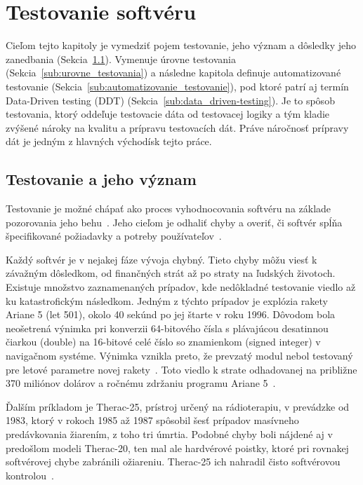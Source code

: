 
\chapter{Testovanie softvéru}
\label{ch:kap2}

Cieľom tejto kapitoly je vymedziť pojem testovanie, jeho význam a dôsledky jeho zanedbania (Sekcia~\ref{sub:testovanie_a_vyznam}). Vymenuje úrovne testovania (Sekcia~\ref{sub:urovne_testovania}) a následne kapitola definuje automatizované testovanie (Sekcia~\ref{sub:automatizovanie_testovanie}), pod ktoré patrí aj termín Data-Driven testing (DDT) (Sekcia~\ref{sub:data_driven-testing}). Je to spôsob testovania, ktorý oddeľuje testovacie dáta od testovacej logiky a tým kladie zvýšené nároky na kvalitu a prípravu testovacích dát. Práve náročnosť prípravy dát je jedným z hlavných východísk tejto práce.

\section{Testovanie a jeho význam}
\label{sub:testovanie_a_vyznam}
Testovanie je možné chápať ako proces vyhodnocovania softvéru na základe pozorovania jeho behu~\cite{Ammann2016}. Jeho cieľom je odhaliť chyby a overiť, či softvér spĺňa špecifikované požiadavky a potreby používateľov~\cite{Myers2011}.

Každý softvér je v nejakej fáze vývoja chybný. Tieto chyby môžu viesť k závažným dôsledkom, od finančných strát až po straty na ľudských životoch. Existuje množstvo zaznamenaných prípadov, kde nedôkladné testovanie viedlo až ku katastrofickým následkom. Jedným z týchto prípadov je explózia rakety Ariane 5 (let 501), okolo 40 sekúnd po jej štarte v roku 1996. Dôvodom bola neošetrená výnimka pri konverzii 64-bitového čísla s plávajúcou desatinnou čiarkou (double) na 16-bitové celé číslo so znamienkom (signed integer) v navigačnom systéme. Výnimka vznikla preto, že prevzatý modul nebol testovaný pre letové parametre novej rakety~\cite{Lions1996}. Toto viedlo k strate odhadovanej na približne 370 miliónov dolárov a ročnému zdržaniu programu Ariane 5~\cite{LeLann1996}.



Ďalším príkladom je Therac-25, prístroj určený na rádioterapiu, v prevádzke od 1983, ktorý v rokoch 1985 až 1987 spôsobil šesť prípadov masívneho predávkovania žiarením, z toho tri úmrtia. Podobné chyby boli nájdené aj v predošlom modeli Therac-20, ten mal ale hardvérové poistky, ktoré pri rovnakej softvérovej chybe zabránili ožiareniu. Therac-25 ich nahradil čisto softvérovou kontrolou~\cite{Leveson1993}.


